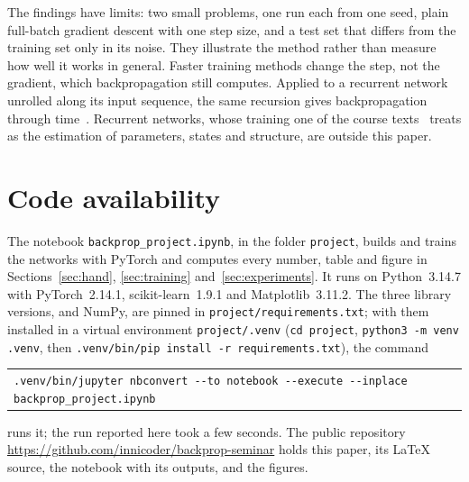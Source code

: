 \documentclass[11pt,a4paper]{amsart}
\numberwithin{equation}{section}
\theoremstyle{plain}
\theoremstyle{definition}
\theoremstyle{remark}
\newcommand{\code}[1]{\texttt{#1}}
\begin{document}
The findings have limits: two small problems, one run each from one
seed, plain full-batch gradient descent with one step size, and a test
set that differs from the training set only in its noise. They
illustrate the method rather than measure how well it works in general.
Faster training methods change the step, not the gradient, which
backpropagation still computes. Applied to a recurrent network unrolled
along its input sequence, the same recursion gives backpropagation
through time~\cite{werbos1990}. Recurrent networks, whose training one
of the course texts~\cite{todorovic2012} treats as the estimation of
parameters, states and structure, are outside this paper.

\section*{Code availability}

The notebook \nolinkurl{backprop_project.ipynb}, in the folder
\nolinkurl{project}, builds and trains the networks with PyTorch and
computes every number, table and figure in Sections~\ref{sec:hand},
\ref{sec:training} and~\ref{sec:experiments}. It runs on Python~3.14.7
with PyTorch~2.14.1, scikit-learn~1.9.1 and Matplotlib~3.11.2. The three
library versions, and NumPy, are pinned in
\mbox{\nolinkurl{project/requirements.txt}}; with them installed in a
virtual environment \mbox{\nolinkurl{project/.venv}} (\code{cd project},
\code{python3 -m venv .venv}, then
\code{.venv/bin/pip install -r requirements.txt}), the command
\begin{center}\scriptsize
\begin{tabular}{@{}l@{}}
  \code{.venv/bin/jupyter nbconvert -{}-to notebook -{}-execute
    -{}-inplace backprop\_project.ipynb}
\end{tabular}
\end{center}
runs it; the run reported here took a few seconds. The public repository
\url{https://github.com/innicoder/backprop-seminar} holds this paper,
its LaTeX source, the notebook with its outputs, and the figures.

\printbibliography
\end{document}
